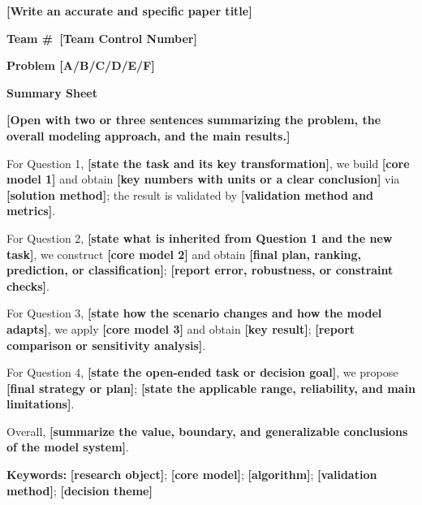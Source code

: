 \documentclass[12pt,letterpaper]{article}
\newcommand{\TeamControlNumber}{\TemplateField{Team Control Number}}
\newcommand{\ProblemChoice}{\TemplateField{A/B/C/D/E/F}}
\newcommand{\TemplateField}[1]{\textbf{[#1]}}
\newcommand{\PaperTitle}{\TemplateField{Write an accurate and specific paper title}}
\begin{document}
\setcounter{page}{1}

\thispagestyle{fancy}
\label{page:counted-first}
\begin{center}
  {\bfseries\large\PaperTitle\par}
  \vspace{0.6em}
  {\bfseries Team \#\ \TeamControlNumber\par}
  {\bfseries Problem \ProblemChoice\par}
  \vspace{1.0em}
  {\bfseries\large Summary Sheet\par}
\end{center}

\TemplateField{Open with two or three sentences summarizing the problem, the overall modeling approach, and the main results.}

For Question 1, \TemplateField{state the task and its key transformation}, we build \TemplateField{core model 1} and obtain \TemplateField{key numbers with units or a clear conclusion} via \TemplateField{solution method}; the result is validated by \TemplateField{validation method and metrics}.

For Question 2, \TemplateField{state what is inherited from Question 1 and the new task}, we construct \TemplateField{core model 2} and obtain \TemplateField{final plan, ranking, prediction, or classification}; \TemplateField{report error, robustness, or constraint checks}.

For Question 3, \TemplateField{state how the scenario changes and how the model adapts}, we apply \TemplateField{core model 3} and obtain \TemplateField{key result}; \TemplateField{report comparison or sensitivity analysis}.

For Question 4, \TemplateField{state the open-ended task or decision goal}, we propose \TemplateField{final strategy or plan}; \TemplateField{state the applicable range, reliability, and main limitations}.

Overall, \TemplateField{summarize the value, boundary, and generalizable conclusions of the model system}.

\vspace{0.6em}
\textbf{Keywords:} \TemplateField{research object}; \TemplateField{core model}; \TemplateField{algorithm}; \TemplateField{validation method}; \TemplateField{decision theme}
\end{document}
